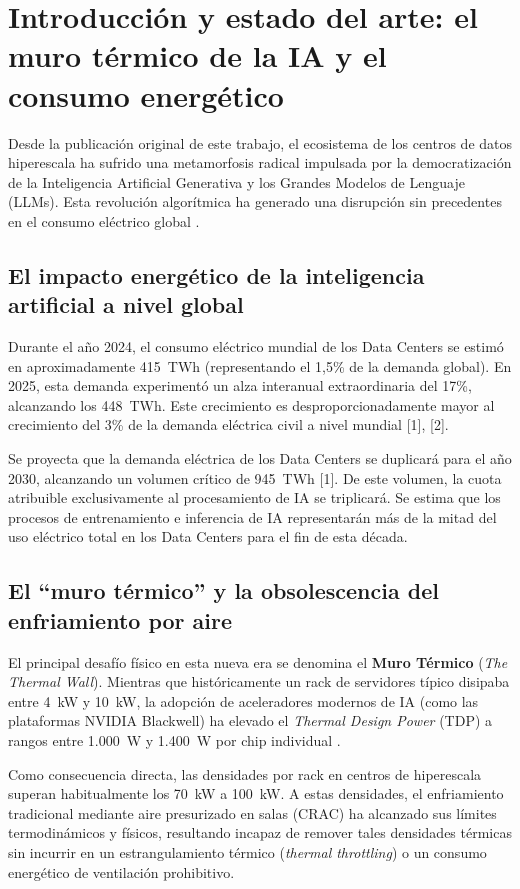 \chapter{Introducci\'on y estado del arte: el muro t\'ermico de la IA y el consumo energ\'etico}
\label{chap:introduccion}

Desde la publicaci\'on original de este trabajo, el ecosistema de los centros de datos hiperescala ha sufrido una metamorfosis radical impulsada por la democratizaci\'on de la Inteligencia Artificial Generativa y los Grandes Modelos de Lenguaje (LLMs). Esta revoluci\'on algor\'itmica ha generado una disrupci\'on sin precedentes en el consumo el\'ectrico global \cite{iea2024}.

\section{El impacto energ\'etico de la inteligencia artificial a nivel global}
Durante el a\~no 2024, el consumo el\'ectrico mundial de los Data Centers se estim\'o en aproximadamente 415~TWh (representando el 1,5\% de la demanda global). En 2025, esta demanda experiment\'o un alza interanual extraordinaria del 17\%, alcanzando los 448~TWh. Este crecimiento es desproporcionadamente mayor al crecimiento del 3\% de la demanda el\'ectrica civil a nivel mundial [1], [2].

Se proyecta que la demanda el\'ectrica de los Data Centers se duplicar\'a para el a\~no 2030, alcanzando un volumen cr\'itico de 945~TWh [1]. De este volumen, la cuota atribuible exclusivamente al procesamiento de IA se triplicar\'a. Se estima que los procesos de entrenamiento e inferencia de IA representar\'an m\'as de la mitad del uso el\'ectrico total en los Data Centers para el fin de esta d\'ecada.

\section{El ``muro t\'ermico'' y la obsolescencia del enfriamiento por aire}
El principal desaf\'io f\'isico en esta nueva era se denomina el \textbf{Muro T\'ermico} (\emph{The Thermal Wall}). Mientras que hist\'oricamente un rack de servidores t\'ipico disipaba entre 4~kW y 10~kW, la adopci\'on de aceleradores modernos de IA (como las plataformas NVIDIA Blackwell) ha elevado el \emph{Thermal Design Power} (TDP) a rangos entre 1.000~W y 1.400~W por chip individual \cite{ashrae2021}.

Como consecuencia directa, las densidades por rack en centros de hiperescala superan habitualmente los 70~kW a 100~kW. A estas densidades, el enfriamiento tradicional mediante aire presurizado en salas (CRAC) ha alcanzado sus l\'imites termodin\'amicos y f\'isicos, resultando incapaz de remover tales densidades t\'ermicas sin incurrir en un estrangulamiento t\'ermico (\emph{thermal throttling}) o un consumo energ\'etico de ventilaci\'on prohibitivo.

